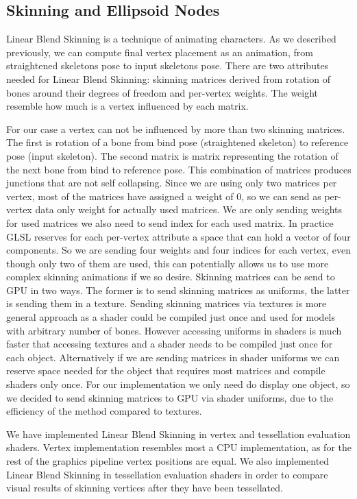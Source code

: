 \subsection{Skinning and Ellipsoid Nodes}

Linear Blend Skinning is a technique of animating characters.
As we described previously, we can compute final vertex placement as an animation, from straightened skeletons pose to input skeletons pose.
There are two attributes needed for Linear Blend Skinning: skinning matrices derived from rotation of bones around their degrees of freedom and per-vertex weights.
The weight resemble how much is a vertex influenced by each matrix.

For our case a vertex can not be influenced by more than two skinning matrices.
The first is rotation of a bone from bind pose (straightened skeleton) to reference pose (input skeleton).
The second matrix is matrix representing the rotation of the next bone from bind to reference pose.
This combination of matrices produces junctions that are not self collapsing.
Since we are using only two matrices per vertex, most of the matrices have assigned a weight of 0, so we can send as per-vertex data only weight for actually used matrices.
We are only sending weights for used matrices we also need to send index for each used matrix.
In practice GLSL reserves for each per-vertex attribute a space that can hold a vector of four components.
So we are sending four weights and four indices for each vertex, even though only two of them are used, this can potentially allows us to use more complex skinning animations if we so desire.
Skinning matrices can be send to GPU in two ways.
The former is to send skinning matrices as uniforms, the latter is sending them in a texture.
Sending skinning matrices via textures is more general approach as a shader could be compiled just once and used for models with arbitrary number of bones.
However accessing uniforms in shaders is much faster that accessing textures and a shader needs to be compiled just once for each object.
Alternatively if we are sending matrices in shader uniforms we can reserve space needed for the object that requires most matrices and compile shaders only once.
For our implementation we only need do display one object, so we decided to send skinning matrices to GPU via shader uniforms, due to the efficiency of the method compared to textures.

We have implemented Linear Blend Skinning in vertex and tessellation evaluation shaders.
Vertex implementation resembles most a CPU implementation, as for the rest of the graphics pipeline vertex positions are equal.
We also implemented Linear Blend Skinning in tessellation evaluation shaders in order to compare visual results of skinning vertices after they have been tessellated.

